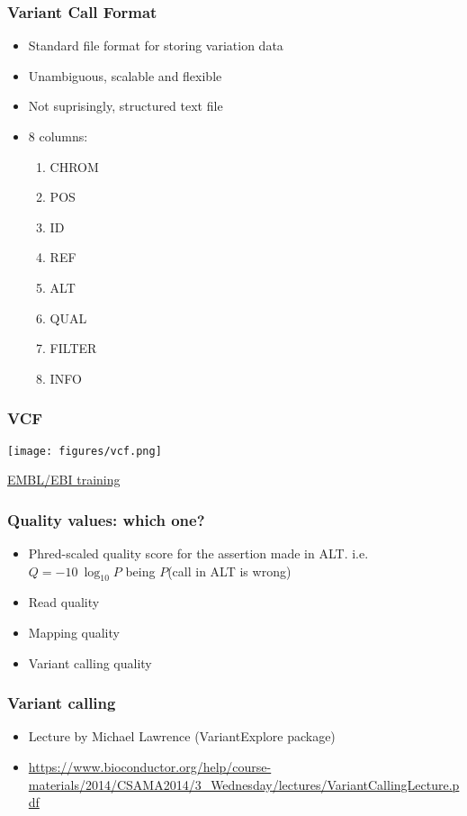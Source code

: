\documentclass{beamer}
\begin{document}
\begin{frame}
  \frametitle{Variant Call Format}
  \begin{itemize}
  \item Standard file format for storing variation data
  \item  Unambiguous, scalable and flexible
  \item Not suprisingly, structured text file
  \item 8 columns: 


    
    \begin{enumerate}
    \item  CHROM
     \item  POS
    \item   ID
    \item   REF
     \item  ALT
     \item  QUAL
     \item  FILTER
     \item  INFO
    \end{enumerate}


  \end{itemize}
\end{frame}


\begin{frame}
  \frametitle{VCF}
\texttt{[image: figures/vcf.png]}

\href{https://www.ebi.ac.uk/training/online/course/human-genetic-variation-introduction/exercise-title/want-know-how-we-did-it}{EMBL/EBI training}
\end{frame}


\begin{frame}
  \frametitle{Quality values: which one?}

  \begin{itemize}
  \item Phred-scaled quality score for the assertion made in ALT. i.e. $Q = -10 \ \log_{10} P$  being $P$(call in ALT is wrong)
  \item Read quality
  \item Mapping quality
  \item Variant calling quality
  \end{itemize}
\end{frame}





\begin{frame}
  \frametitle{Variant calling}
  \begin{itemize}
  \item Lecture by Michael Lawrence (VariantExplore package)
  \item \url{https://www.bioconductor.org/help/course-materials/2014/CSAMA2014/3_Wednesday/lectures/VariantCallingLecture.pdf}
  \end{itemize}
\end{frame}
\end{document}
